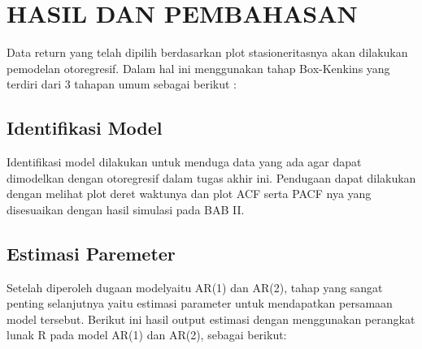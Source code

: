 \chapter{HASIL DAN PEMBAHASAN}
Data return yang telah dipilih berdasarkan plot stasioneritasnya akan dilakukan pemodelan otoregresif. Dalam hal ini menggunakan tahap Box-Kenkins yang terdiri dari 3 tahapan umum sebagai berikut :
\section{Identifikasi Model}
Identifikasi model dilakukan untuk menduga data yang ada agar dapat dimodelkan dengan otoregresif dalam tugas akhir ini. Pendugaan dapat dilakukan dengan melihat plot deret waktunya dan plot ACF serta PACF nya yang disesuaikan dengan hasil simulasi pada BAB II.
\section{Estimasi Paremeter}
Setelah diperoleh dugaan modelyaitu AR(1) dan AR(2), tahap yang sangat penting selanjutnya yaitu estimasi parameter untuk mendapatkan persamaan model tersebut. Berikut ini hasil output estimasi dengan menggunakan perangkat lunak R pada model AR(1) dan AR(2), sebagai berikut:
